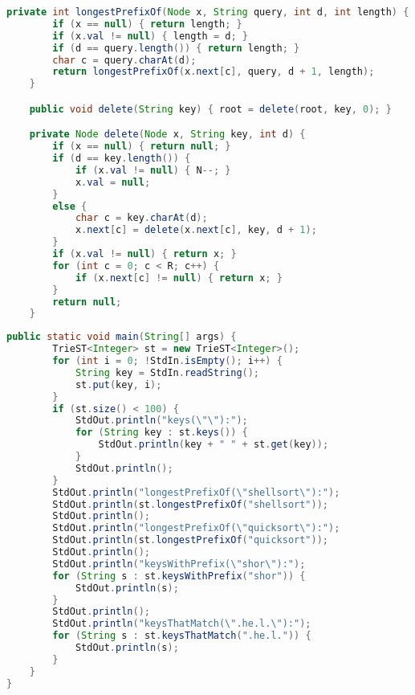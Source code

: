 \documentclass[8pt,a4paper,compress]{beamer}
\begin{document}
\begin{frame}[fragile]
\pause

\begin{lstlisting}[language=Java]
    private int longestPrefixOf(Node x, String query, int d, int length) {
        if (x == null) { return length; }
        if (x.val != null) { length = d; }
        if (d == query.length()) { return length; }
        char c = query.charAt(d);
        return longestPrefixOf(x.next[c], query, d + 1, length);
    }

    public void delete(String key) { root = delete(root, key, 0); }

    private Node delete(Node x, String key, int d) {
        if (x == null) { return null; }
        if (d == key.length()) {
            if (x.val != null) { N--; }
            x.val = null;
        }
        else {
            char c = key.charAt(d);
            x.next[c] = delete(x.next[c], key, d + 1);
        }
        if (x.val != null) { return x; }
        for (int c = 0; c < R; c++) {
            if (x.next[c] != null) { return x; }
        }
        return null;
    }
\end{lstlisting}
\end{frame}

\begin{frame}[fragile]
\pause

\begin{lstlisting}[language=Java]
    public static void main(String[] args) {
        TrieST<Integer> st = new TrieST<Integer>();
        for (int i = 0; !StdIn.isEmpty(); i++) {
            String key = StdIn.readString();
            st.put(key, i);
        }
        if (st.size() < 100) {
            StdOut.println("keys(\"\"):");
            for (String key : st.keys()) {
                StdOut.println(key + " " + st.get(key));
            }
            StdOut.println();
        }
        StdOut.println("longestPrefixOf(\"shellsort\"):");
        StdOut.println(st.longestPrefixOf("shellsort"));
        StdOut.println();
        StdOut.println("longestPrefixOf(\"quicksort\"):");
        StdOut.println(st.longestPrefixOf("quicksort"));
        StdOut.println();
        StdOut.println("keysWithPrefix(\"shor\"):");
        for (String s : st.keysWithPrefix("shor")) { 
            StdOut.println(s); 
        }
        StdOut.println();
        StdOut.println("keysThatMatch(\".he.l.\"):");
        for (String s : st.keysThatMatch(".he.l.")) { 
            StdOut.println(s); 
        }
    }
}
\end{lstlisting}
\end{frame}
\end{document}
